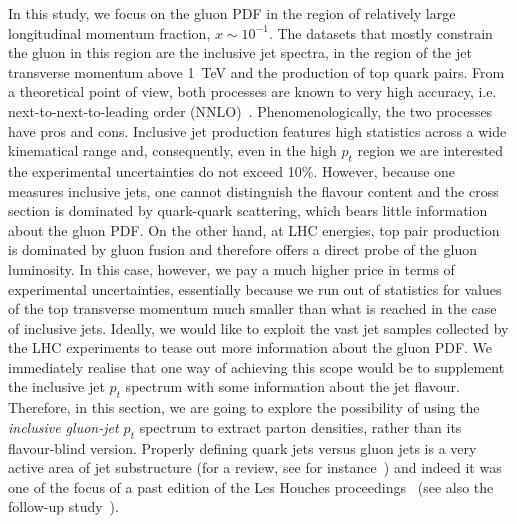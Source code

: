 In this study, we focus on the gluon PDF in the region of relatively large longitudinal momentum fraction, $x\sim 10^{-1}$. The datasets that mostly constrain the gluon in this region are the inclusive jet spectra, in the region of the jet transverse momentum above 1~TeV and the production of top quark pairs. From a theoretical point of view, both processes are known to very high accuracy, i.e. next-to-next-to-leading order (NNLO)~\cite{Czakon:2015owf,Currie:2016bfm}. Phenomenologically, the two processes have pros and cons. Inclusive jet production features high statistics across a wide kinematical range and, consequently, even in the high $p_t$ region we are interested the experimental uncertainties do not exceed 10\%. However, because one measures inclusive jets, one cannot distinguish the flavour content and the cross section is dominated by quark-quark scattering, which bears little information about the gluon PDF. 
%
On the other hand, at LHC energies, top pair production is dominated by gluon fusion and therefore offers a direct probe of the gluon luminosity. In this case, however, we pay a much higher price in terms of experimental uncertainties, essentially because we run out of statistics for values of the top transverse momentum much smaller than what is reached in the case of inclusive jets. 
%
Ideally, we would like to exploit the vast jet samples collected by the LHC experiments to tease out more information about the gluon PDF. We immediately realise that one way of achieving this scope would be to supplement the inclusive jet $p_t$ spectrum with some information about the jet flavour. 
%
Therefore, in this section, we are going to explore the possibility of using the \emph{inclusive gluon-jet $p_t$} spectrum to extract parton densities, rather than its flavour-blind version. Properly defining quark jets versus gluon jets is a very active area of jet substructure (for a review, see for instance~\cite{Marzani:2019hun}) and indeed it was one of the focus of a past edition of the Les Houches proceedings~\cite{Badger:2016bpw} (see also the follow-up study~\cite{Gras:2017jty}). 


